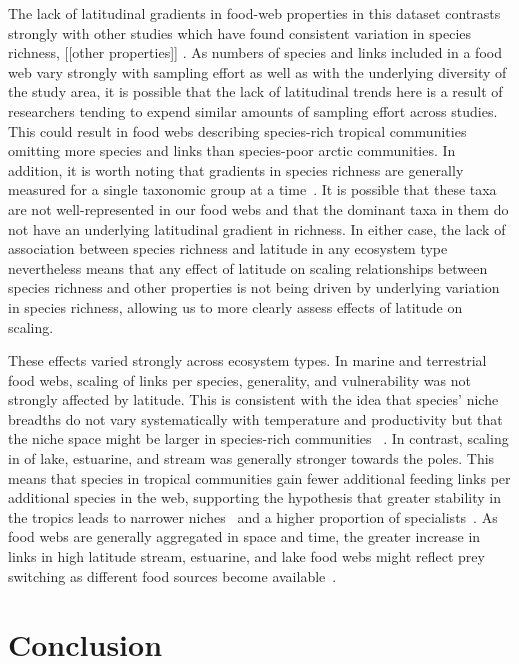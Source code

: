 \documentclass[12pt]{article}
\begin{document}
The lack of latitudinal gradients in food-web properties in this dataset contrasts
strongly with other studies which have found consistent variation in species richness,
[[other properties]] \citep{}. As numbers of species and links included in a food web
vary strongly with sampling effort as well as with the underlying diversity of the study
area, it is possible that the lack of latitudinal trends here is a result of researchers
tending to expend similar amounts of sampling effort across studies. This could result in
food webs describing species-rich tropical communities omitting more species and links
than species-poor arctic communities. In addition, it is worth noting that gradients in
species richness are generally measured for a single taxonomic group at a time~\citep{}.
It is possible that these taxa are not well-represented in our food webs and that the
dominant taxa in them do not have an underlying latitudinal gradient in richness. In
either case, the lack of association between species richness
and latitude in any ecosystem type nevertheless means that any effect of latitude on scaling relationships
between species richness and other properties is not being driven by underlying variation in
species richness, allowing us to more clearly assess effects of latitude on scaling.


These effects varied strongly across ecosystem types. In marine and terrestrial food webs,
scaling of links per species, generality, and vulnerability was not strongly affected by
latitude. This is consistent with the idea that species' niche breadths do not vary systematically
with temperature and productivity but that the niche space might be larger in species-rich communities
~\citep{Davies2007}. In contrast, scaling in of lake, estuarine, and stream was generally stronger
towards the poles. This means that species in tropical communities gain fewer additional feeding links
per additional species in the web, supporting the hypothesis that greater stability in the tropics
leads to narrower niches~\citep{Brown2004} and a higher proportion of specialists~\citep{}. As food webs
are generally aggregated in space and time, the greater increase in links in high latitude stream, 
estuarine, and lake food webs might reflect prey switching as different food sources become
available~\citep{}. 


\section*{Conclusion}
\end{document}
